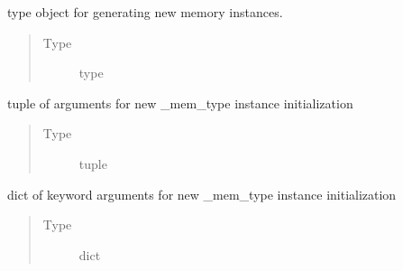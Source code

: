 \documentclass[letterpaper,10pt,english]{sphinxmanual}
\begin{document}
\begin{fulllineitems}
\begin{fulllineitems}
\begin{quote}
\begin{description}
\end{description}\end{quote}

\end{fulllineitems}


\begin{fulllineitems}
\label{\detokenize{dalio.base:dalio.base.memory.LazyRunner._mem_type}}
type object for generating new memory instances.
\begin{quote}\begin{description}
\item[{Type}] \leavevmode
type

\end{description}\end{quote}

\end{fulllineitems}


\begin{fulllineitems}
\label{\detokenize{dalio.base:dalio.base.memory.LazyRunner._args}}
tuple of arguments for new \_mem\_type instance
initialization
\begin{quote}\begin{description}
\item[{Type}] \leavevmode
tuple

\end{description}\end{quote}

\end{fulllineitems}


\begin{fulllineitems}
\label{\detokenize{dalio.base:dalio.base.memory.LazyRunner._kwargs}}
dict of keyword arguments for new \_mem\_type instance
initialization
\begin{quote}\begin{description}
\item[{Type}] \leavevmode
dict


\end{description}
\end{quote}
\end{fulllineitems}
\end{fulllineitems}
\end{document}
